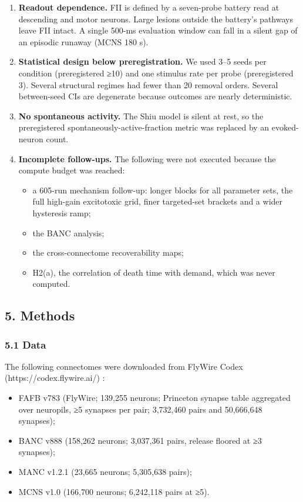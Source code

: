 \documentclass[11pt]{article}
\providecommand{\tightlist}{\setlength{\itemsep}{0pt}\setlength{\parskip}{0pt}}
\begin{document}
\begin{enumerate}
\item
  \textbf{Readout dependence.} FII is defined by a seven-probe battery read at descending and motor neurons. Large lesions outside the battery's pathways leave FII intact. A single 500-ms evaluation window can fall in a silent gap of an episodic runaway (MCNS 180 s).
\item
  \textbf{Statistical design below preregistration.} We used 3--5 seeds per condition (preregistered ≥10) and one stimulus rate per probe (preregistered 3). Several structural regimes had fewer than 20 removal orders. Several between-seed CIs are degenerate because outcomes are nearly deterministic.
\item
  \textbf{No spontaneous activity.} The Shiu model is silent at rest, so the preregistered spontaneously-active-fraction metric was replaced by an evoked-neuron count.
\item
  \textbf{Incomplete follow-ups.} The following were not executed because the compute budget was reached:

  \begin{itemize}
  \tightlist
  \item
    a 605-run mechanism follow-up: longer blocks for all parameter sets, the full high-gain excitotoxic grid, finer targeted-set brackets and a wider hysteresis ramp;
  \item
    the BANC analysis;
  \item
    the cross-connectome recoverability maps;
  \item
    H2(a), the correlation of death time with demand, which was never computed.
  \end{itemize}
\end{enumerate}

\subsection{5. Methods}\label{methods}

\subsubsection{5.1 Data}\label{data}

The following connectomes were downloaded from FlyWire Codex (https://codex.flywire.ai/) \cite{dorkenwald2024,schlegel2024,bates2026,takemura2024,marin2024,berg2026}:

\begin{itemize}
\tightlist
\item
  FAFB v783 (FlyWire; 139,255 neurons; Princeton synapse table aggregated over neuropils, ≥5 synapses per pair; 3,732,460 pairs and 50,666,648 synapses);
\item
  BANC v888 (158,262 neurons; 3,037,361 pairs, release floored at ≥3 synapses);
\item
  MANC v1.2.1 (23,665 neurons; 5,305,638 pairs);
\item
  MCNS v1.0 (166,700 neurons; 6,242,118 pairs at ≥5).
\end{itemize}
\end{document}
